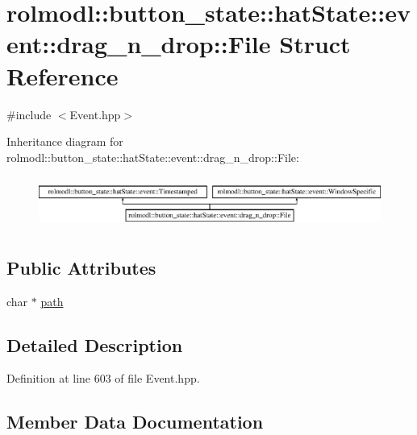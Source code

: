 \hypertarget{structrolmodl_1_1button__state_1_1hat_state_1_1event_1_1drag__n__drop_1_1_file}{}\section{rolmodl\+::button\+\_\+state\+::hat\+State\+::event\+::drag\+\_\+n\+\_\+drop\+::File Struct Reference}
\label{structrolmodl_1_1button__state_1_1hat_state_1_1event_1_1drag__n__drop_1_1_file}


{\ttfamily \#include $<$Event.\+hpp$>$}

Inheritance diagram for rolmodl\+::button\+\_\+state\+::hat\+State\+::event\+::drag\+\_\+n\+\_\+drop\+::File\+:\begin{figure}[H]
\begin{center}
\leavevmode
\includegraphics[height=1.707317cm]{structrolmodl_1_1button__state_1_1hat_state_1_1event_1_1drag__n__drop_1_1_file}
\end{center}
\end{figure}
\subsection*{Public Attributes}
\begin{DoxyCompactItemize}
\item 
char $\ast$ \mbox{\hyperlink{structrolmodl_1_1button__state_1_1hat_state_1_1event_1_1drag__n__drop_1_1_file_aa446739e9ef88bcc066852483548dfaf}{path}}
\end{DoxyCompactItemize}


\subsection{Detailed Description}


Definition at line 603 of file Event.\+hpp.



\subsection{Member Data Documentation}
\mbox{\label{structrolmodl_1_1button__state_1_1hat_state_1_1event_1_1drag__n__drop_1_1_file_aa446739e9ef88bcc066852483548dfaf}} 
